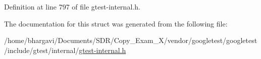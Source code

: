 Definition at line 797 of file gtest-\/internal.\+h.



The documentation for this struct was generated from the following file\+:\begin{DoxyCompactItemize}
\item 
/home/bhargavi/\+Documents/\+S\+D\+R/\+Copy\+\_\+\+Exam\+\_\+X/vendor/googletest/googletest/include/gtest/internal/\hyperlink{gtest-internal_8h}{gtest-\/internal.\+h}\end{DoxyCompactItemize}
